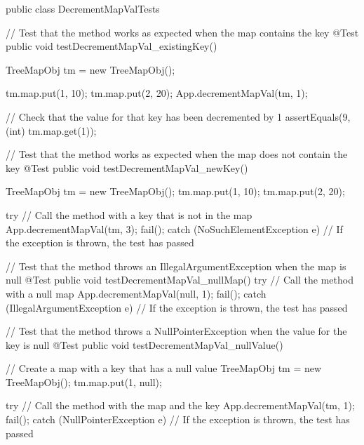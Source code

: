 \documentclass[a4paper]{article}
\begin{document}
  \hspace{-2cm}\begin{verbbox}[]
 public class DecrementMapValTests {
  // Test that the method works as expected when the map contains the key
  @Test
  public void testDecrementMapVal_existingKey() {
    TreeMapObj tm = new TreeMapObj();

    tm.map.put(1, 10);
    tm.map.put(2, 20);
    App.decrementMapVal(tm, 1);

    // Check that the value for that key has been decremented by 1
    assertEquals(9, (int) tm.map.get(1));
  }

  // Test that the method works as expected when the map does not contain the key
  @Test
  public void testDecrementMapVal_newKey() {
  TreeMapObj tm = new TreeMapObj();
  tm.map.put(1, 10);
  tm.map.put(2, 20);

  try {
    // Call the method with a key that is not in the map
    App.decrementMapVal(tm, 3);
    fail();
  } catch (NoSuchElementException e) {
    // If the exception is thrown, the test has passed
  }
}

  // Test that the method throws an IllegalArgumentException when the map is null
@Test
public void testDecrementMapVal_nullMap() {
  try {
    // Call the method with a null map
    App.decrementMapVal(null, 1);
    fail();
  } catch (IllegalArgumentException e) {
    // If the exception is thrown, the test has passed
  }
}

  // Test that the method throws a NullPointerException when the value for the key is null
  @Test
  public void testDecrementMapVal_nullValue() {
    // Create a map with a key that has a null value
    TreeMapObj tm = new TreeMapObj();
    tm.map.put(1, null);

    try {
      // Call the method with the map and the key
      App.decrementMapVal(tm, 1);
      fail();
    } catch (NullPointerException e) {
      // If the exception is thrown, the test has passed
    }
  }
}

   \end{verbbox}
   \theverbbox
\end{document}
